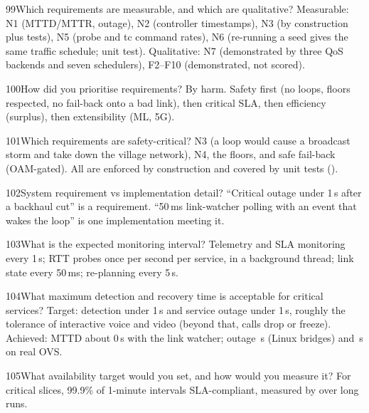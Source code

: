 \begin{qa}{99}{Which requirements are measurable, and which are qualitative?}
Measurable: N1 (MTTD/MTTR, outage), N2 (controller timestamps), N3 (by construction plus tests), N5 (probe and tc
command rates), N6 (re-running a seed gives the same traffic schedule; unit test). Qualitative: N7 (demonstrated by
three QoS backends and seven schedulers), F2--F10 (demonstrated, not scored).
\end{qa}

\begin{qa}{100}{How did you prioritise requirements?}
By harm. Safety first (no loops, floors respected, no fail-back onto a bad link), then critical SLA, then efficiency
(surplus), then extensibility (ML, 5G).
\end{qa}

\begin{qa}{101}{Which requirements are safety-critical?}
N3 (a loop would cause a broadcast storm and take down the village network), N4, the floors, and safe fail-back
(OAM-gated). All are enforced by construction and covered by unit tests ().
\end{qa}

\begin{qa}{102}{System requirement vs implementation detail?}
``Critical outage under 1\,s after a backhaul cut'' is a requirement. ``50\,ms link-watcher polling with an event that
wakes the loop'' is one implementation meeting it.
\end{qa}

\begin{qa}{103}{What is the expected monitoring interval?}
Telemetry and SLA monitoring every 1\,s; RTT probes once per second per service, in a background thread; link state
every 50\,ms; re-planning every 5\,s.
\end{qa}

\begin{qa}{104}{What maximum detection and recovery time is acceptable for critical services?}
Target: detection under 1\,s and service outage under 1\,s, roughly the tolerance of interactive voice and video
(beyond that, calls drop or freeze). Achieved: MTTD about 0\,s with the link watcher; outage \NOutCutFullMean\,s
(Linux bridges) and \NOvsOutageAfter\,s on real OVS.
\end{qa}

\begin{qa}{105}{What availability target would you set, and how would you measure it?}
For critical slices, 99.9\% of 1-minute intervals SLA-compliant, measured by  over long runs.
\end{qa}

